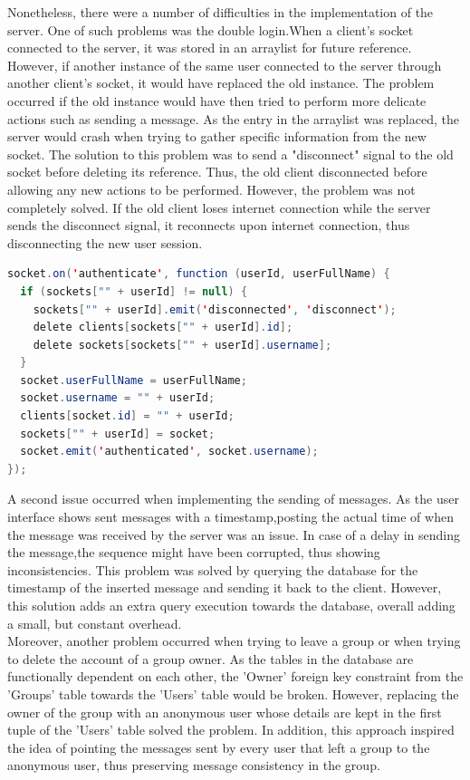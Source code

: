 \documentclass{article}
\begin{document}
\begin{enumerate}
	Nonetheless, there were a number of difficulties in the implementation of the server. One of such problems was the double login.When a client's socket connected to the server, it was stored in an arraylist for future reference. However, if another instance of the same user connected to the server through another client's socket, it would have replaced the old instance. The problem occurred if the old instance would have then tried to perform more delicate actions such as sending a message. As the entry in the arraylist was replaced, the server would crash when trying to gather specific information from the new socket. The solution to this problem was to send a "disconnect" signal to the old socket before deleting its reference. Thus, the old client disconnected before allowing any new actions to be performed. However, the problem was not completely solved. If the old client loses internet connection while the server sends the disconnect signal, it reconnects upon internet connection, thus disconnecting the new user session.\\
	
		\begin{lstlisting}[language=Java]
socket.on('authenticate', function (userId, userFullName) {
  if (sockets["" + userId] != null) {
    sockets["" + userId].emit('disconnected', 'disconnect');
    delete clients[sockets["" + userId].id];
    delete sockets[sockets["" + userId].username];
  }
  socket.userFullName = userFullName;
  socket.username = "" + userId;
  clients[socket.id] = "" + userId;
  sockets["" + userId] = socket;
  socket.emit('authenticated', socket.username);
});
	\end{lstlisting}
	
	A second issue occurred when implementing the sending of messages. As the user interface shows sent messages with a timestamp,posting the actual time of when the message was received by the server was an issue. In case of a delay in sending the message,the sequence might have been corrupted, thus showing inconsistencies. This problem was solved by querying the database for the timestamp of the inserted message and sending it back to the client. However, this solution adds an extra query execution towards the database, overall adding a small, but constant overhead.\\
	
	Moreover, another problem occurred when trying to leave a group or when trying to delete the account of a group owner. As the tables in the database are functionally dependent on each other, the 'Owner' foreign key constraint from the 'Groups' table towards the 'Users' table would be broken. However, replacing the owner of the group with an anonymous user whose details are kept in the first tuple of the 'Users' table solved the problem. In addition, this approach inspired the idea of pointing the messages sent by every user that left a group to the anonymous user, thus preserving message consistency in the group.\\
	

\end{enumerate}
\end{document}
